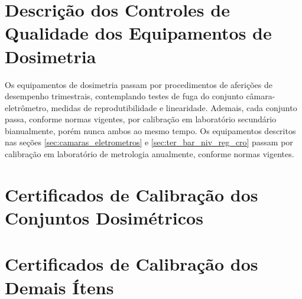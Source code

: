 \begin{table}[!h]
    \centering
    \caption{Fantoma.}
    \label{tab:outros_detectores}
\end{table}

    
\section{Descrição dos Controles de Qualidade dos Equipamentos de Dosimetria}
Os equipamentos de dosimetria passam por procedimentos de aferições de desempenho trimestrais, contemplando testes de fuga do conjunto câmara-eletrômetro, medidas de reprodutibilidade e linearidade. Ademais, cada conjunto passa, conforme normas vigentes, por calibração em laboratório secundário bianualmente, porém nunca ambos ao mesmo tempo.
Os equipamentos descritos nas seções \ref{sec:camaras_eletrometros} e \ref{sec:ter_bar_niv_reg_cro}  passam por calibração em laboratório de metrologia anualmente, conforme normas vigentes.

\pagebreak
\section{Certificados de Calibração dos Conjuntos Dosimétricos}
\label{sec:certificados_conjuntos-dosimetricos}

\pagebreak
\section{Certificados de Calibração dos Demais Ítens}
\label{sec:certificados_demais}
